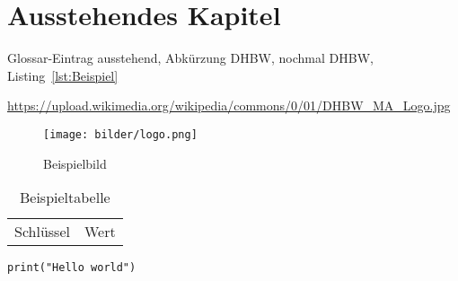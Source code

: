 \section{Ausstehendes Kapitel}

Glossar\hyp{}Eintrag \gls{ausstehend}, Abkürzung \ac{DHBW}, nochmal \ac{DHBW}, Listing~\ref{lst:Beispiel}

\begin{sloppypar}
\url{https://upload.wikimedia.org/wikipedia/commons/0/01/DHBW_MA_Logo.jpg} %
\end{sloppypar}


\begin{figure}
    \caption{Beispielbild}
    \texttt{[image: bilder/logo.png]}
\end{figure}

\begin{table}
    \caption{Beispieltabelle}
    \begin{tabular}{ll}
        Schlüssel&Wert
    \end{tabular}
\end{table}

\begin{lstfloat}
\begin{lstlisting}
print("Hello world")
\end{lstlisting}
\end{lstfloat}
